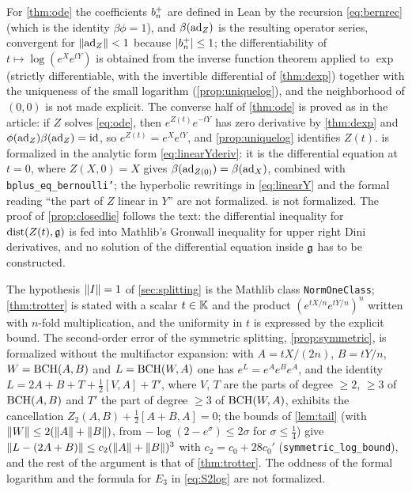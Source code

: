 For \cref{thm:ode} the coefficients $b^{+}_{n}$ are defined in Lean by the
recursion \eqref{eq:bernrec} (which is the identity $\beta\phi=1$), and
$\beta(\operatorname{ad}_Z)$ is the resulting operator series, convergent for
$\left\lVert\operatorname{ad}_Z\right\rVert<1$ because $|b^{+}_{n}|\leq1$; the differentiability of
$t\mapsto\log(e^Xe^{tY})$ is obtained from the inverse function theorem
applied to $\exp$ (strictly differentiable, with the invertible differential
of \cref{thm:dexp}) together with the uniqueness of the small logarithm
(\cref{prop:uniquelog}), and the neighborhood of $(0,0)$ is not made
explicit. The converse half of \cref{thm:ode} is proved as in the article:
if $Z$ solves \eqref{eq:ode}, then $e^{Z(t)}e^{-tY}$ has zero derivative by
\cref{thm:dexp} and $\phi(\operatorname{ad}_Z)\beta(\operatorname{ad}_Z)=\operatorname{id}$, so $e^{Z(t)}=e^Xe^{tY}$,
and \cref{prop:uniquelog} identifies $Z(t)$.  is
formalized in the analytic form \eqref{eq:linearYderiv}: it is the
differential equation at $t=0$, where $Z(X,0)=X$ gives
$\beta(\operatorname{ad}_{Z(0)})=\beta(\operatorname{ad}_X)$, combined with
\texttt{bplus\_eq\_bernoulli'}; the hyperbolic rewritings in
\eqref{eq:linearY} and the formal reading ``the part of $Z$ linear in $Y$''
are not formalized.  is not formalized. The proof of \cref{prop:closedlie} follows the text: the
differential inequality for $\operatorname{dist}(Z(t),\mathfrak{g})$ is fed into
Mathlib's Gronwall inequality for upper right Dini derivatives, and no
solution of the differential equation inside $\mathfrak{g}$ has to be constructed.

The hypothesis $\left\lVert I\right\rVert=1$ of \cref{sec:splitting} is the Mathlib class
\texttt{NormOneClass}; \cref{thm:trotter} is stated with a scalar $t\in\mathbb{K}$
and the product $(e^{tX/n}e^{tY/n})^n$ written with $n$-fold multiplication,
and the uniformity in $t$ is expressed by the explicit bound. The
second-order error of the symmetric splitting, \cref{prop:symmetric}, is
formalized without the multifactor expansion: with $A=tX/(2n)$, $B=tY/n$,
$W=\operatorname{BCH}(A,B)$ and $L=\operatorname{BCH}(W,A)$ one has $e^L=e^Ae^Be^A$, and the identity
$L=2A+B+T+\tfrac12[V,A]+T'$, where $V$, $T$ are the parts of degree
$\geq2$, $\geq3$ of $\operatorname{BCH}(A,B)$ and $T'$ the part of degree $\geq3$ of
$\operatorname{BCH}(W,A)$, exhibits the cancellation $Z_2(A,B)+\tfrac12[A+B,A]=0$; the
bounds of \cref{lem:tail} (with $\left\lVert W\right\rVert\leq2(\left\lVert A\right\rVert+\left\lVert B\right\rVert)$, from
$-\log(2-e^{\sigma})\leq2\sigma$ for $\sigma\leq\tfrac14$) give
$\left\lVert L-(2A+B)\right\rVert\leq c_2(\left\lVert A\right\rVert+\left\lVert B\right\rVert)^3$ with $c_2=c_0+28c_0'$
(\texttt{symmetric\_log\_bound}), and the rest of the argument is that of
\cref{thm:trotter}. The oddness of the formal logarithm and the formula for
$E_3$ in \eqref{eq:S2log} are not formalized.

